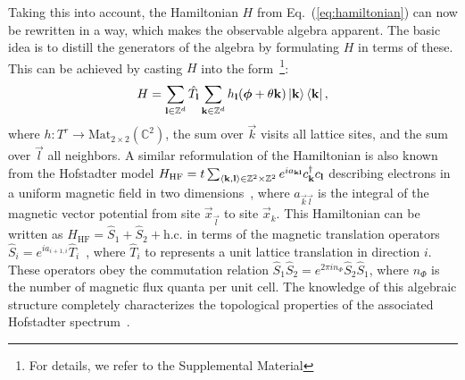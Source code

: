 \documentclass[
    aps,
    prl,
    twocolumn,
    floatfix,
    superscriptaddress
]{revtex4-2}
\newcommand{\revise}[1]{{\color{blue}#1}}
\begin{document}

Taking this into account, the Hamiltonian $H$ from Eq.~(\ref{eq:hamiltonian}) can now be rewritten in a way, which makes the observable algebra apparent.
The basic idea is to distill the generators of the algebra by formulating $H$ in terms of these.
This can be achieved by casting $H$ into the form~\footnote{For details, we refer to the Supplemental Material}:
\begin{equation}
    H =  \sum_{\mathbf{l} \in \mathbb{Z}^d} \hat{T}_{\mathbf{l}}  \sum_{\mathbf{k} \in \mathbb{Z}^d} h_{\mathbf{l}}( \boldsymbol{\phi} + \theta \mathbf{k} ) \ket{ \mathbf{k}} \bra{ \mathbf{k}} ,
    \label{eq:covariant_hamiltonian}
\end{equation}
where $h\colon T^r \to \mathrm{Mat}_{2\times2} (\mathbb{C}^2)$,
the sum over $\vec{k}$ visits all lattice sites, and the sum over $\vec{l}$ all neighbors.
\revise{
A similar reformulation of the Hamiltonian is also known from the Hofstadter model $H_\mathrm{HF} = t \sum_{\braket{\mathbf{k},\mathbf{l}} \in \mathbb{Z}^{2} \times \mathbb{Z}^2}e^{i a_{\mathbf{k} \mathbf{l}}} c_{\mathbf{k}}^\dagger c_{\mathbf{l}} $ describing electrons in a uniform magnetic field in two dimensions~\cite{Hofstadter1976}, where $a_{\vec{k} \vec{l}}$ is the integral of the magnetic vector potential from site $\vec{x}_\vec{l}$ to site $\vec{x}_k$.
This Hamiltonian can be written as $H_\mathrm{HF} = \hat{S}_1 +  \hat{S}_2 + \mathrm{h.c.} $ in terms of the magnetic translation operators $\hat{S}_i = e^{i a_{i+1,i}} \hat{T}_i$~\cite{Zak1964}, where $\hat{T}_i$ to represents a unit lattice translation in direction $i$.
These operators obey the commutation relation $\hat{S}_1 \hat{S}_2 = e^{2\pi i n_\Phi} \hat{S}_2 \hat{S}_1$, where $n_\Phi$ is the number of magnetic flux quanta per unit cell.
The knowledge of this algebraic structure completely characterizes the topological properties of the associated Hofstadter spectrum~\cite{Hofstadter1976, Bellissard1994, Prodan2016}.
}
\end{document}

